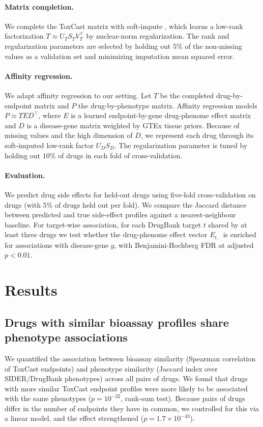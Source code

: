\documentclass[11pt]{article}
\begin{document}
\paragraph{Matrix completion.} We complete the ToxCast matrix with soft-impute \cite{mazumder2010softimpute}, which learns a low-rank factorization $T \approx U_T S_T V_T^\top$ by nuclear-norm regularization. The rank and regularization parameters are selected by holding out $5\%$ of the non-missing values as a validation set and minimizing imputation mean squared error.

\paragraph{Affinity regression.} We adapt affinity regression \cite{pelossof2015affinity} to our setting. Let $T$ be the completed drug-by-endpoint matrix and $P$ the drug-by-phenotype matrix. Affinity regression models $P \approx T E D^\top$, where $E$ is a learned endpoint-by-gene drug-phenome effect matrix and $D$ is a disease-gene matrix weighted by GTEx tissue priors. Because of missing values and the high dimension of $D$, we represent each drug through its soft-imputed low-rank factor $U_D S_D$. The regularization parameter is tuned by holding out $10\%$ of drugs in each fold of cross-validation.

\paragraph{Evaluation.} We predict drug side effects for held-out drugs using five-fold cross-validation on drugs (with $5\%$ of drugs held out per fold). We compare the Jaccard distance between predicted and true side-effect profiles against a nearest-neighbour baseline. For target-wise association, for each DrugBank target $t$ shared by at least three drugs we test whether the drug-phenome effect vector $E_{t,\cdot}$ is enriched for associations with disease-gene $g$, with Benjamini-Hochberg FDR at adjusted $p < 0.01$.

\section{Results}

\subsection{Drugs with similar bioassay profiles share phenotype associations}
We quantified the association between bioassay similarity (Spearman correlation of ToxCast endpoints) and phenotype similarity (Jaccard index over SIDER/DrugBank phenotypes) across all pairs of drugs. We found that drugs with more similar ToxCast endpoint profiles were more likely to be associated with the same phenotypes ($p = 10^{-22}$, rank-sum test). Because pairs of drugs differ in the number of endpoints they have in common, we controlled for this via a linear model, and the effect strengthened ($p = 1.7 \times 10^{-43}$).
\end{document}
